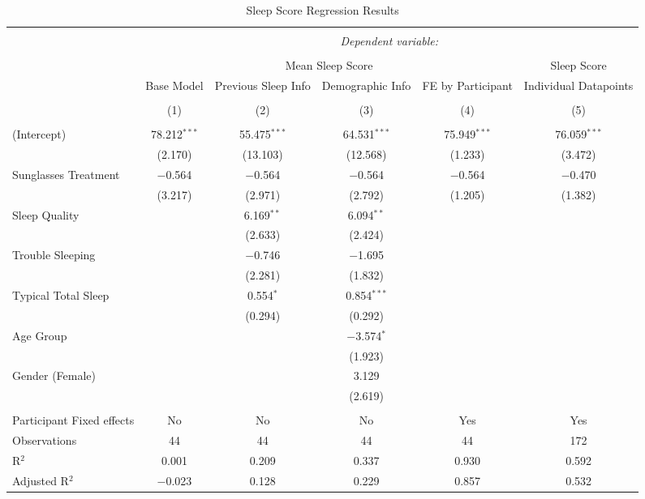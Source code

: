 \documentclass[
]{article}
\begin{document}
\begin{sidewaystable}[!htbp] \centering 
  \caption{Sleep Score Regression Results} 
  \label{} 
\small 
\begin{tabular}{@{\extracolsep{5pt}}lccccc} 
\\[-1.8ex]\hline 
\hline \\[-1.8ex] 
 & \multicolumn{5}{c}{\textit{Dependent variable:}} \\ 
\cline{2-6} 
\\[-1.8ex] & \multicolumn{4}{c}{Mean Sleep Score} & Sleep Score \\ 
 & Base Model & Previous Sleep Info & Demographic Info & FE by Participant & Individual Datapoints \\ 
\\[-1.8ex] & (1) & (2) & (3) & (4) & (5)\\ 
\hline \\[-1.8ex] 
 (Intercept) & 78.212$^{***}$ & 55.475$^{***}$ & 64.531$^{***}$ & 75.949$^{***}$ & 76.059$^{***}$ \\ 
  & (2.170) & (13.103) & (12.568) & (1.233) & (3.472) \\ 
  Sunglasses Treatment & $-$0.564 & $-$0.564 & $-$0.564 & $-$0.564 & $-$0.470 \\ 
  & (3.217) & (2.971) & (2.792) & (1.205) & (1.382) \\ 
  Sleep Quality &  & 6.169$^{**}$ & 6.094$^{**}$ &  &  \\ 
  &  & (2.633) & (2.424) &  &  \\ 
  Trouble Sleeping &  & $-$0.746 & $-$1.695 &  &  \\ 
  &  & (2.281) & (1.832) &  &  \\ 
  Typical Total Sleep &  & 0.554$^{*}$ & 0.854$^{***}$ &  &  \\ 
  &  & (0.294) & (0.292) &  &  \\ 
  Age Group &  &  & $-$3.574$^{*}$ &  &  \\ 
  &  &  & (1.923) &  &  \\ 
  Gender (Female) &  &  & 3.129 &  &  \\ 
  &  &  & (2.619) &  &  \\ 
 \hline \\[-1.8ex] 
Participant Fixed effects & No & No & No & Yes & Yes \\ 
Observations & 44 & 44 & 44 & 44 & 172 \\ 
R$^{2}$ & 0.001 & 0.209 & 0.337 & 0.930 & 0.592 \\ 
Adjusted R$^{2}$ & $-$0.023 & 0.128 & 0.229 & 0.857 & 0.532 \\ 

\end{tabular}
\end{sidewaystable}
\end{document}
